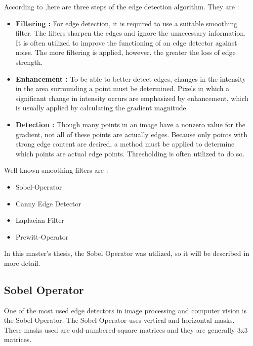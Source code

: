 According to \cite{Machine_Vision},here are three steps of the edge detection algorithm. They are :

\begin{itemize}

\item \textbf{Filtering : } For edge detection, it is required to use a suitable smoothing filter. The filters sharpen the edges and ignore the unnecessary information. It is often utilized to improve the functioning of an edge detector against noise. The more filtering is applied, however, the greater the loss of edge strength.
 
\item \textbf{Enhancement : } To be able to better detect edges, changes in the intensity in the area surrounding a point must be determined. Pixels in which a significant change in intensity occurs are emphasized by enhancement, which is usually applied by calculating the gradient magnitude.
  
\item \textbf{Detection : } Though many points in an image have a nonzero value for the gradient, not all of these points are actually edges. Because only points with strong edge content are desired, a method must be applied to determine which points are actual edge points. Thresholding is often utilized to do so.
 
\end{itemize}

Well known smoothing filters are :

\begin{itemize}

 \item Sobel-Operator
 \item Canny Edge Detector
 \item Laplacian-Filter
 \item Prewitt-Operator
 
 \end{itemize}
 
In this master's thesis, the Sobel Operator was utilized, so it will be described in more detail.

%
\subsection{Sobel Operator}\label{sec:Sobel Operator}

One of the most used edge detectors in image processing and computer vision is the Sobel Operator. The Sobel Operator uses vertical and horizontal masks. These masks used are odd-numbered square matrices and they are generally 3x3 matrices.


